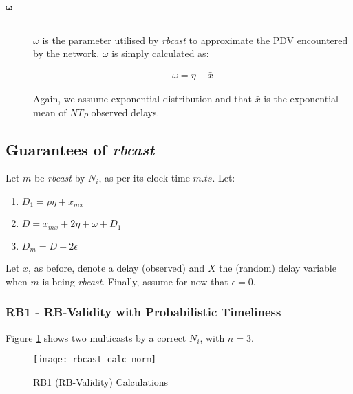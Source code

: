 \begin{description}
        \item[\Huge$\boldsymbol{\omega}$] \hfill \\
        $\omega$ is the parameter utilised by \emph{rbcast} to approximate the PDV encountered by the network.  $\omega$ is simply calculated as:
        
        \begin{equation}
            \begin{aligned}
                \omega = \eta - \bar{x}
            \end{aligned}
        \end{equation}        
        
        Again, we assume exponential distribution and that $\bar{x}$ is the exponential mean of $NT_P$ observed delays.
        \end{description}

        \newpage
        \subsection*{Guarantees of \emph{rbcast}}
        Let $m$ be \emph{rbcast} by $N_i$, as per its clock time $m.ts$.  Let:
        
        \begin{enumerate}[label=\roman*]
            \item    $D_1 = \rho \eta + x_{mx}$
            \item    $D = x_{mx}  + 2\eta + \omega + D_1$
            \item    $D_m  = D  + 2\epsilon$
        \end{enumerate}
        
        Let $x$, as before, denote a delay (observed) and $X$ the (random) delay variable when $m$ is being \emph{rbcast}.  Finally, assume for now that $\epsilon = 0$.  
        
        \subsubsection*{RB1 - RB-Validity with Probabilistic Timeliness}        
        
        Figure \ref{fig:rbcast_calc} shows two multicasts by a correct $N_i$, with $n = 3$.  
        \begin{figure}[H]
                \centering    
                \centerline{\texttt{[image: rbcast\_calc\_norm]}}
                \caption[RB1 (RB-Validity) Calculations]{RB1 (RB-Validity) Calculations}
                \label{fig:rbcast_calc}
        \end{figure}    
        
